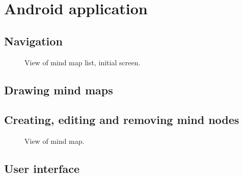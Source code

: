 \section{Android application}
\label{sec:android-app}

\subsection{Navigation}
\label{subsec:drawing}
\begin{figure}[h]
	\centering
	\caption{View of mind map list, initial screen.}
	\label{fig:screen-maplist}
\end{figure}

\subsection{Drawing mind maps}
\label{subsec:drawing}

\subsection{Creating, editing and removing mind nodes}
\label{subsec:drawing}

\begin{figure}[h]
	\centering
	\caption{View of mind map.}
	\label{fig:screen-map}
\end{figure}

\subsection{User interface}
\label{subsec:ui}
